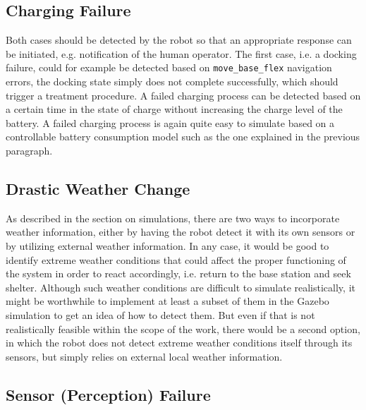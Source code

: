 \documentclass[english, master, utf8]{base/thesis_KBS}
\newcommand{\code}[1]{\colorbox{light-gray}{\texttt{#1}}}
\begin{document}
\subsection{Charging Failure}
\label{sec:sim_and_mon_charging_failures}

Both cases should be detected by the robot so that an appropriate response can be initiated, e.g. notification of the human operator. The first case, i.e. a docking 
failure, could for example be detected based on \code{move\_base\_flex} navigation errors, the docking state simply does not complete successfully, which should trigger
a treatment procedure. A failed charging process can be detected based on a certain time in the state of charge without increasing the charge level of the battery.\newline
A failed charging process is again quite easy to simulate based on a controllable battery consumption model such as the one explained in the previous paragraph.

\subsection{Drastic Weather Change}
\label{sec:sim_and_mon_drastic_weather}

As described in the section on simulations, there are two ways to incorporate weather information, either by having the robot detect it with its own sensors or by 
utilizing external weather information. In any case, it would be good to identify extreme weather conditions that could affect the proper functioning of the system 
in order to react accordingly, i.e. return to the base station and seek shelter.\newline
Although such weather conditions are difficult to simulate realistically, it might be worthwhile to implement at least a subset of them in the Gazebo
simulation to get an idea of how to detect them. But even if that is not realistically feasible within the scope of the work, there would be a second
option, in which the robot does not detect extreme weather conditions itself through its sensors, but simply relies on external local weather information.

\subsection{Sensor (Perception) Failure}
\label{sec:sim_and_mon_sensor_failures}
\end{document}
